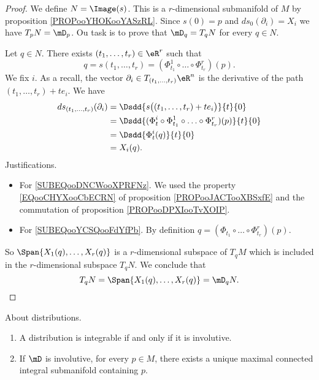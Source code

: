 \begin{proof}
    We define \( N=\Image(s)\). This is a \( r\)-dimensional submanifold of \( M\) by proposition \ref{PROPooYHOKooYASzRL}. Since \( s(0)=p\) and \( ds_0(\partial_i)=X_i\) we have \( T_pN=\mD_p\). Ou task is to prove that \( \mD_q=T_qN\) for every \( q\in N\).

    Let \( q\in N\). There exists \( (t_1,\ldots, t_r)\in \eR^r\) such that
    \begin{equation}
        q=s(t_1,\ldots, t_r)=(\Phi_{t_1}^1\circ \ldots\circ\Phi_{t_r}^r)(p).
    \end{equation}
    We fix \( i\). As a recall, the vector \( \partial_i\in T_{(t_1,\ldots, t_r)}\eR^n\) is the derivative of the path \( (t_1,\ldots, t_r)+te_i\). We have
    \begin{subequations}
        \begin{align}
            ds_{(t_1,\ldots, t_r)}(\partial_i)&=\Dsdd{ s\big( (t_1,\ldots, t_r)+te_i \big) }{t}{0}\\
            &=\Dsdd{ (\Phi_t^i\circ\Phi_{t_1}^1\circ\ldots\circ\Phi_{t_r}^r)(p)    }{t}{0}     \label{SUBEQooDNCWooXPRFNz}\\
            &=\Dsdd{ \Phi_t^i(q) }{t}{0}        \label{SUBEQooYCSQooFdYfPb}     \\
            &=X_i(q).
        \end{align}
    \end{subequations}
    Justifications.
    \begin{itemize}
        \item For \eqref{SUBEQooDNCWooXPRFNz}. We used the property \eqref{EQooCHYXooCbECRN} of proposition \ref{PROPooJACTooXBSxfE} and the commutation of proposition \ref{PROPooDPXIooTvXOIP}.
        \item For \eqref{SUBEQooYCSQooFdYfPb}. By definition \( q=(\Phi_{t_1}\circ\ldots\circ\Phi_{t_r}^r)(p)\).
    \end{itemize}
    So \( \Span\{ X_1(q),\ldots, X_r(q) \}\) is a \( r\)-dimensional subspace of \( T_qM\) which is included in the \( r\)-dimensional subspace \( T_qN\). We conclude that
    \begin{equation}
        T_qN=\Span\{ X_1(q),\ldots, X_r(q) \}=\mD_qN.
    \end{equation}
\end{proof}


\begin{theorem}      \label{THOooVRDYooIusxwW}
    About distributions.
    \begin{enumerate}
        \item       \label{ITEMooLDUZooJCwZek}
            A distribution is integrable if and only if it is involutive.
        \item       \label{ITEMooCQEAooRsLSOV}
            If \( \mD\) is involutive, for every \( p\in M\), there exists a unique maximal connected integral submanifold containing \( p\).
    \end{enumerate}
\end{theorem}

